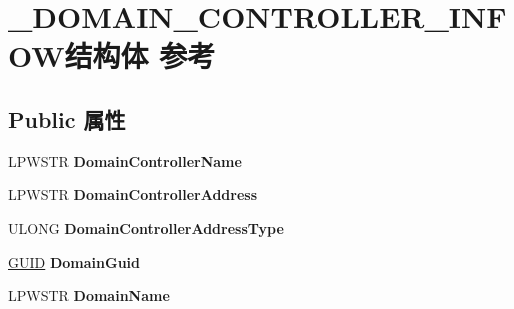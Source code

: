 \hypertarget{struct___d_o_m_a_i_n___c_o_n_t_r_o_l_l_e_r___i_n_f_o_w}{}\section{\+\_\+\+D\+O\+M\+A\+I\+N\+\_\+\+C\+O\+N\+T\+R\+O\+L\+L\+E\+R\+\_\+\+I\+N\+F\+O\+W结构体 参考}
\label{struct___d_o_m_a_i_n___c_o_n_t_r_o_l_l_e_r___i_n_f_o_w}
\subsection*{Public 属性}
\begin{DoxyCompactItemize}
\item 
\mbox{\label{struct___d_o_m_a_i_n___c_o_n_t_r_o_l_l_e_r___i_n_f_o_w_a2e411854540997156631270b0ae1c8b3}} 
L\+P\+W\+S\+TR {\bfseries Domain\+Controller\+Name}
\item 
\mbox{\label{struct___d_o_m_a_i_n___c_o_n_t_r_o_l_l_e_r___i_n_f_o_w_a323b774cd0c426668b76a242902c254e}} 
L\+P\+W\+S\+TR {\bfseries Domain\+Controller\+Address}
\item 
\mbox{\label{struct___d_o_m_a_i_n___c_o_n_t_r_o_l_l_e_r___i_n_f_o_w_ae5b9ef9200d7597fa8c71f4f3b76bf95}} 
U\+L\+O\+NG {\bfseries Domain\+Controller\+Address\+Type}
\item 
\mbox{\label{struct___d_o_m_a_i_n___c_o_n_t_r_o_l_l_e_r___i_n_f_o_w_a4f9cfaba63323667be384b31502a6b3b}} 
\hyperlink{interface_g_u_i_d}{G\+U\+ID} {\bfseries Domain\+Guid}
\item 
\mbox{\label{struct___d_o_m_a_i_n___c_o_n_t_r_o_l_l_e_r___i_n_f_o_w_aab0f9831c6f3b03d01e7f2efa884bcd8}} 
L\+P\+W\+S\+TR {\bfseries Domain\+Name}
\item 
\mbox{\label{struct___d_o_m_a_i_n___c_o_n_t_r_o_l_l_e_r___i_n_f_o_w_a06644959e9af3555a5ead5cae8da26b1}} 

\end{DoxyCompactItemize}
